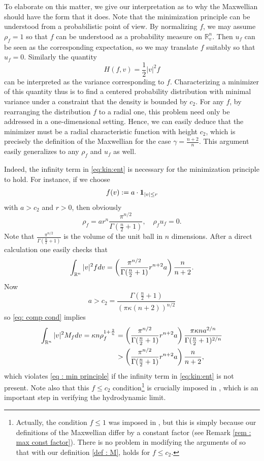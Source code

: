 \documentclass{amsart}
\theoremstyle{plain}
\theoremstyle{remark}
\numberwithin{equation}{section}
\newcommand{\R}{\mathbb{R}}
\newcommand{\dv}{\textnormal{d}v}
\newcommand{\lt}{\left}
\newcommand{\rt}{\right}
\newcommand{\intr}{\int_{\R^n}}
\begin{document}
To elaborate on this matter, we give our interpretation as to why the Maxwellian should have the form that it does. Note that the minimization principle can be understood from a probabilistic point of view. By normalizing $f$, we may assume $\rho_f = 1$ so that $f$ can be understood as a probability measure on $\R^n_v$. Then $u_f$ can be seen as the corresponding expectation, so we may translate $f$ suitably so that $u_f =0$. Similarly the quantity
\[
H(f,v) = \frac{1}{2}|v|^2 f
\]
can be interpreted as the variance corresponding to $f$. Characterizing a minimizer of this quantity thus is to find a centered probability distribution with minimal variance under a constraint that the density is bounded by $c_2$. For any $f$, by rearranging the distribution $f$ to a radial one, this problem need only be addressed in a one-dimensional setting. Hence, we can easily deduce that the minimizer must be a radial characteristic function with height $c_2$, which is precisely the definition of the Maxwellian for the case $\gamma=\frac{n+2}{n}$. This argument easily generalizes to any $\rho_f$ and $u_f$ as well. 

Indeed, the infinity term in \eqref{eq:kin:ent} is necessary for the minimization principle to hold. For instance, if we choose
\[
f(v):= a \cdot {\bf 1}_{|v| \le r}
\]
with $a>c_2$ and $r>0$, then obviously
\[
\rho_f = ar^n\frac{\pi^{n/2}}{\Gamma(\frac{n}{2}+1)},\quad \rho_fu_f=0.
\]
Note that $\frac{\pi^{n/2}}{\Gamma(\frac{n}{2}+1)}$ is the volume of the unit ball in $n$ dimensions. After a direct calculation one easily checks that
\[
\intr |v|^2 f \dv =\lt(\frac{\pi^{n/2}}{\Gamma(\frac{n}{2}+1)}r^{n+2}a\rt) \frac{n}{n+2}.
\]
Now
\[
a > c_2 = \frac{\Gamma(\frac{n}{2}+1)}{(\pi \kappa (n+2))^{n/2}}
\]
so \eqref{eq: comp cond} implies
\begin{equation*}
\begin{split}
\intr |v|^2 M_f \dv =\kappa n \rho_f^{1+\frac{2}{n}} &=  \lt(\frac{\pi^{n/2}}{\Gamma(\frac{n}{2}+1)}r^{n+2}a\rt) \frac{\pi \kappa n a^{2/n}}{\Gamma(\frac{n}{2}+1)^{2/n}} \\
&>\lt(\frac{\pi^{n/2}}{\Gamma(\frac{n}{2}+1)}r^{n+2}a\rt) \frac{n}{n+2},
\end{split}
\end{equation*}
which violates \eqref{eq : min principle} if the infinity term in \eqref{eq:kin:ent} is not present. Note also that this $f\le c_2$ condition\footnote{Actually, the condition $f \le 1$ was imposed in \cite[Proposition 4.1]{berthelinvasseur2005}, but this is simply because our definitions of the Maxwellian differ by a constant factor (see Remark \ref{rem : max const factor}). There is no problem in modifying the arguments of \cite{berthelinvasseur2005} so that with our definition \eqref{def : M}, \cite[Proposition 4.1]{berthelinvasseur2005} holds for $f \le c_2$.} is crucially imposed in \cite[Proposition 4.1]{berthelinvasseur2005}, which is an important step in verifying the hydrodynamic limit.
\end{document}
